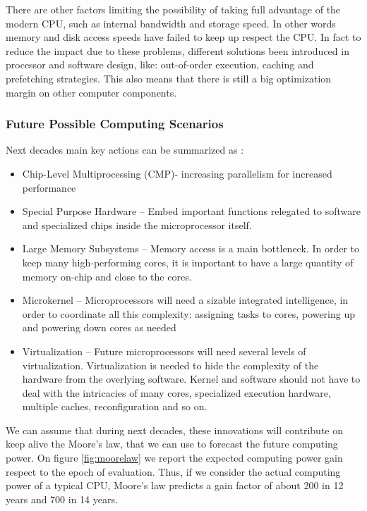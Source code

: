 There are other factors limiting the possibility of taking full advantage of the modern CPU, 
such as internal bandwidth and storage speed. In other words memory and disk access speeds have failed 
to keep up respect the CPU. In fact to reduce the impact due to these problems, different solutions been introduced 
 in processor and software design, like: out-of-order execution, caching and prefetching
strategies. This also means that there is still a  big optimization margin on other computer components.
\FloatBarrier
\subsubsection{Future Possible Computing Scenarios}

Next decades  main key actions can be summarized as :
\begin{itemize}
\item Chip-Level Multiprocessing (CMP)- increasing parallelism for increased performance
\item Special Purpose Hardware -- Embed important functions relegated to software and specialized chips inside the microprocessor itself.
\item Large Memory Subsystems -- Memory access is a main bottleneck. In order to keep many high-performing cores, it is important to have a large quantity of memory on-chip and close to the cores.
\item Microkernel -- Microprocessors will need a sizable integrated intelligence, in order to coordinate all this complexity: assigning tasks to cores, powering up and powering down cores as needed
\item Virtualization -- Future microprocessors will need several levels of
virtualization. Virtualization is needed to hide the complexity of the hardware
from the overlying software. Kernel and software should not have to deal with the intricacies of many cores, specialized execution hardware, multiple caches, reconfiguration and so on.
\end{itemize}

We can assume that during next decades, these innovations will contribute on keep alive the Moore's law, that we 
can use to forecast the future computing power. On figure \ref{fig:moorelaw} we report the expected computing power 
gain respect to the epoch of evaluation. Thus, if we consider the actual computing power of a typical CPU, Moore's
law predicts a gain factor of about 200 in 12 years and 700 in 14 years.

